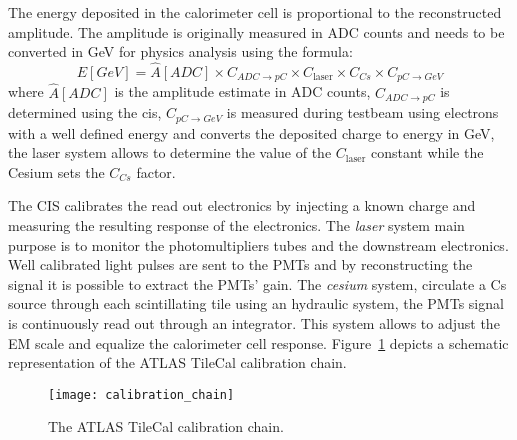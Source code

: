 The energy deposited in the calorimeter cell is proportional to the
reconstructed amplitude. The amplitude is originally measured in ADC counts and
needs to be converted in GeV for physics analysis using the formula:
\begin{equation}
  \label{eq:70}
  E[GeV] = \hat{A}[ADC] \times C_{ADC \rightarrow pC} \times C_{\text{laser}}
  \times C_{Cs} \times C_{pC \rightarrow GeV}
\end{equation}
where $\hat{A}[ADC]$ is the amplitude estimate in ADC counts, $C_{ADC \rightarrow
pC}$ is determined using the \gls{cis}, $C_{pC \rightarrow
  GeV}$ is measured during testbeam using electrons with a well defined energy
and converts the deposited charge to energy in GeV, the laser system allows to
determine the value of the $C_{\text{laser}}$ constant while the Cesium sets the
$C_{Cs}$ factor.

The CIS calibrates the read out electronics by injecting a known charge and
measuring the resulting response of the electronics. The \emph{laser} system
main purpose is to monitor the photomultipliers tubes and the downstream
electronics. Well calibrated light pulses are sent to the PMTs and by
reconstructing the signal it is possible to extract the PMTs' gain. The
\emph{cesium} system, circulate a Cs source through each scintillating tile
using an hydraulic system, the PMTs signal is continuously read out through an
integrator. This system allows to adjust the EM scale and equalize the
calorimeter cell response. Figure~\ref{fig:cali_chain} depicts a schematic
representation of the ATLAS TileCal calibration chain.

\begin{figure}[!h]
  \centering
    \texttt{[image: calibration\_chain]}
    \caption{The ATLAS TileCal calibration chain.}
    \label{fig:cali_chain}
\end{figure}
